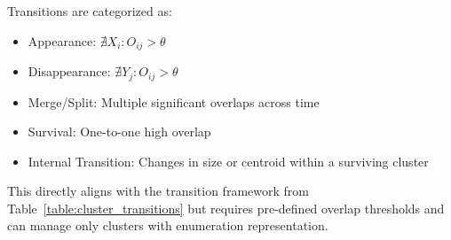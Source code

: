 Transitions are categorized as:
\begin{itemize}
    \item Appearance: $\nexists X_i: O_{ij} > \theta$

    \item Disappearance: $\nexists Y_j: O_{ij} > \theta$

    \item Merge/Split: Multiple significant overlaps across time

    \item Survival: One-to-one high overlap

    \item Internal Transition: Changes in size or centroid within a surviving cluster
\end{itemize}

This directly aligns with the transition framework from
Table~\ref{table:cluster_transitions} but requires pre-defined overlap
thresholds and can manage only clusters with enumeration representation.

